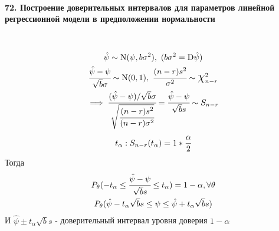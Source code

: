 \documentclass[titlepage]{article}
\newcommand{\sN}{\mathrm{N}} %
\newcommand*{\bigchi}{\mbox{\Large$\chi$}} %
\begin{document}
\paragraph{72. Построение доверительных интервалов для параметров линейной регрессионной модели в предположении нормальности} ~\\
\begin{gather*}
	\hat\psi \sim \sN(\psi,b\sigma^2),\ (b\sigma^2=\mathrm{D}\hat\psi)\\
	\cfrac{\hat\psi-\psi}{\sqrt{b}\sigma}\sim\sN(0,1),\ \cfrac{(n-r)s^2}{\sigma^2}\sim\bigchi_{n-r}^2\\
	\implies \cfrac{(\hat\psi-\psi)/\sqrt{b}\sigma}{\sqrt{\cfrac{(n-r)s^2}{(n-r)\sigma^2}}} = \cfrac{\hat\psi-\psi}{\sqrt{b}s} \sim S_{n-r}\\
	t_\alpha:S_{n-r}(t_\alpha) = 1 * \cfrac{\alpha}{2}
\end{gather*}
Тогда
\begin{gather*}
	P_\theta(-t_\alpha \leq \cfrac{\hat\psi-\psi}{\sqrt{b}s} \leq t_\alpha) = 1 - \alpha, \forall \theta\\
	P_\theta(\hat\psi - t_\alpha\sqrt{b}s \leq \psi \leq \hat\psi + t_\alpha\sqrt{b}s)\\
\end{gather*}
И $\hat\psi \pm t_\alpha\sqrt{b}s$ - доверительный интервал уровня доверия $1 - \alpha$
\end{document}
